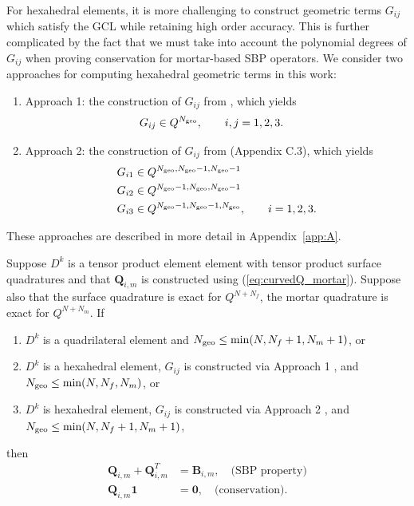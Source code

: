 \documentclass{svjour3}                     %
\begin{document}
For hexahedral elements, it is more challenging to construct geometric terms $G_{ij}$ which satisfy the GCL while retaining high order accuracy.  This is further complicated by the fact that we must take into account the polynomial degrees of $G_{ij}$ when proving conservation for mortar-based SBP operators.  We consider two approaches for computing hexahedral geometric terms in this work:
\begin{enumerate}
\item Approach 1: the construction of $G_{ij}$ from \cite{kopriva2006metric, chan2018efficient}, which yields 
\begin{align*}
&G_{ij} \in Q^{N_{\rm geo}}, \qquad i,j = 1,2,3.
\end{align*}
\item Approach 2: the construction of $G_{ij}$ from \cite{kozdon2018energy} (Appendix C.3), which yields
\begin{align*}
&G_{i1} \in Q^{N_{\rm geo},N_{\rm geo}-1,N_{\rm geo}-1}\\
&G_{i2} \in Q^{N_{\rm geo}-1,N_{\rm geo},N_{\rm geo}-1}\\
&G_{i3} \in Q^{N_{\rm geo}-1,N_{\rm geo}-1,N_{\rm geo}}, \qquad i = 1,2,3.
\end{align*}
\end{enumerate}
These approaches are described in more detail in Appendix~\ref{app:A}.  
\begin{lemma}
\label{lemma:Qmprops_3d}
Suppose $D^k$ is a tensor product element element with tensor product surface quadratures and that $\bm{Q}_{i,m}$ is constructed using (\ref{eq:curvedQ_mortar}).  Suppose also that the surface quadrature is exact for $Q^{N+N_f}$,  the mortar quadrature is exact for $Q^{N+N_m}$.  If 
\begin{enumerate}
\item $D^k$ is a quadrilateral element and $N_{\rm geo} \leq \min(N,N_f+1,N_m+1)$, or
\item $D^k$ is a hexahedral element, $G_{ij}$ is constructed via Approach 1 \cite{kopriva2006metric}, and $N_{\rm geo} \leq \min(N,N_f,N_m)$, or
\item $D^k$ is hexahedral element, $G_{ij}$ is constructed via Approach 2 \cite{kozdon2018energy}, and $N_{\rm geo} \leq \min(N,N_f+1,N_m+1)$, 
\end{enumerate}
then 
\begin{align*}
\bm{Q}_{i,m} + \bm{Q}_{i,m}^T &= \bm{B}_{i,m}, \quad \text{(SBP property)}\\
\bm{Q}_{i,m}\bm{1} &= \bm{0}, \quad \text{(conservation)}.
\end{align*}
\end{lemma}
\end{document}
